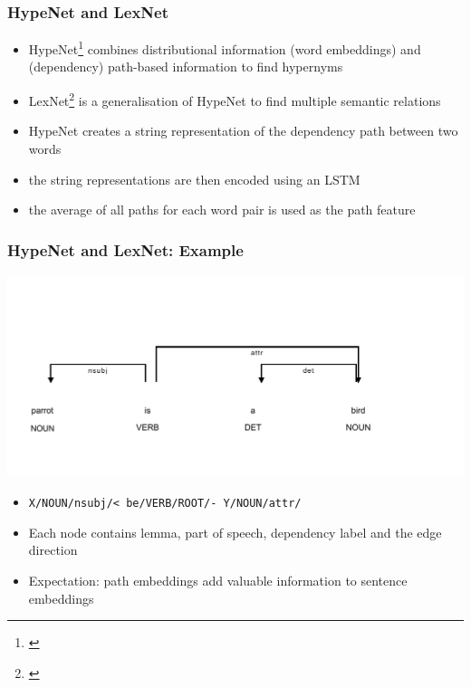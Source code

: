 \documentclass[11pt,aspectratio=169,usenames,dvipsnames]{beamer}
\begin{document}
    \begin{frame}[t]
        \frametitle{HypeNet and LexNet}
        \begin{itemize}
            \item HypeNet\footnote{\cite{DBLP:conf/acl/ShwartzGD16}} combines distributional information (word embeddings) and (dependency) path-based information to find hypernyms
            \item LexNet\footnote{\cite{DBLP:journals/corr/ShwartzD16}} is a generalisation of HypeNet to find multiple semantic relations\pause
            \item HypeNet creates a string representation of the dependency path between two words
            \item the string representations are then encoded using an LSTM
            \item the average of all paths for each word pair is used as the path feature
        \end{itemize}
    \end{frame}


    \begin{frame}[t]
        \frametitle{HypeNet and LexNet: Example}
        \begin{center}
            \includegraphics[scale=0.7,trim={0cm 0.5cm 0cm 0.25cm},clip]{images/hypenet_example}
        \end{center}

        \begin{itemize}
            \item \texttt{X/NOUN/nsubj/< be/VERB/ROOT/- Y/NOUN/attr/}
            \item Each node contains lemma, part of speech, dependency label and the edge direction
            \item Expectation: path embeddings add valuable information to sentence embeddings

        \end{itemize}
    \end{frame}
\end{document}
